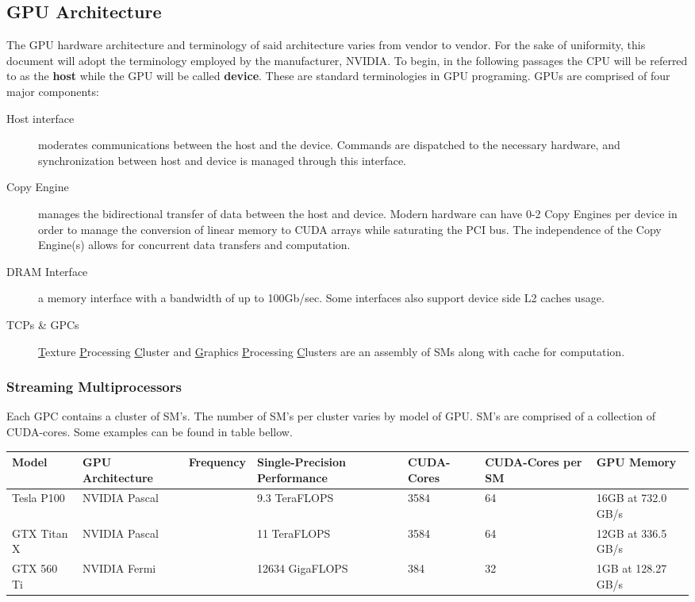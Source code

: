 \subsection{GPU Architecture}\label{ssec:gpu_architecture}
The GPU hardware architecture and terminology of said architecture varies from
vendor to vendor.  For the sake of uniformity, this document will adopt the
terminology employed by the manufacturer, NVIDIA.  To begin, in the following passages the CPU
will be referred to as the \textbf{host} while the GPU will be called \textbf{device}.
These are standard terminologies in GPU programing. GPUs are comprised of four major components:
\begin{description}
  \item[Host interface] moderates communications between the host and the device.
  Commands are dispatched to the necessary hardware, and synchronization between
  host and device is managed through this interface.
  \item[Copy Engine] manages the bidirectional transfer of data between the host
  and device.  Modern hardware can have 0-2 Copy Engines per device in order to
  manage the conversion of linear memory to CUDA arrays while saturating the PCI
  bus.  The independence of the Copy Engine(s) allows for concurrent data transfers
  and computation.
  \item[DRAM Interface] a memory interface with a bandwidth of up to 100Gb/sec\cite{Wilt}.
  Some interfaces also support device side L2 caches usage.
  \item[TCPs \& GPCs] \underline{T}exture \underline{P}rocessing \underline{C}luster
  and \underline{G}raphics \underline{P}rocessing \underline{C}lusters are an assembly
  of \Glspl{SM} along with cache for computation.
\end{description}\cite{Wilt}

\subsubsection{Streaming Multiprocessors}
Each GPC contains a cluster of SM's.  The number of SM's per cluster varies by
model of GPU. SM's are comprised of a collection of CUDA-cores.  Some examples
 can be found in table bellow.
\begin{center}
\begin{tabu} to 0.8\textwidth { | X[l] | X[c] | X[c] | X[c]| X[c]| X[c]| X[r] | }

 \hline
 Model & GPU Architecture & Frequency & Single-Precision Performance & CUDA-Cores & CUDA-Cores per SM & GPU Memory \\
 \hline
 Tesla P100 & NVIDIA Pascal & &9.3 TeraFLOPS & 3584 & 64 & 16GB at 732.0 GB/s\\
 \hline
 GTX Titan X & NVIDIA Pascal & & 11 TeraFLOPS & 3584 & 64 & 12GB at 336.5 GB/s\\
 \hline
 GTX 560 Ti & NVIDIA Fermi & &12634 GigaFLOPS & 384 & 32  & 1GB at 128.27 GB/s\\
\hline
\end{tabu}
\end{center}

